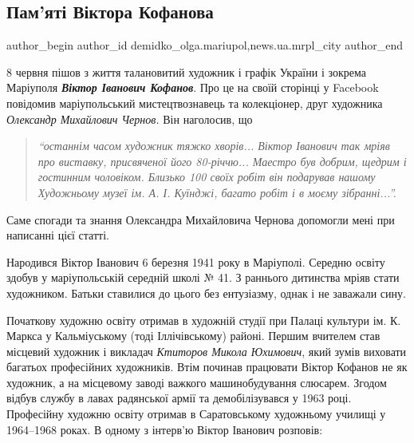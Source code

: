  
 
 
 
 
 
\subsection{Пам'яті Віктора Кофанова}
\label{sec:10_06_2021.stz.news.ua.mrpl_city.1.viktor_kofanov}
 
\ifcmt
 author_begin
   author_id demidko_olga.mariupol,news.ua.mrpl_city
 author_end
\fi


8 червня пішов з життя талановитий художник і графік України і зокрема
Маріуполя \emph{\textbf{Віктор Іванович Кофанов}}. Про це на своїй сторінці у Facebook
повідомив маріупольський мистецтвознавець та колекціонер, друг художника
\emph{Олександр Михайлович Чернов.} Він наголосив, що 
\begin{quote}
\em\enquote{останнім часом художник тяжко
хворів... Віктор Іванович так мріяв про виставку, присвяченої його 80-річчю...
Маестро був добрим, щедрим і гостинним чоловіком. Близько 100 своїх робіт він
подарував нашому Художньому музеї ім. А. І. Куїнджі, багато робіт і в моєму
зібранні...}. 
\end{quote}
Саме спогади та знання Олександра Михайловича Чернова допомогли
мені при написанні цієї статті.

Народився Віктор Іванович 6 березня 1941 року в Маріуполі. Середню освіту
здобув у маріупольській середній школі № 41. З раннього дитинства мріяв стати
художником. Батьки ставилися до цього без ентузіазму, однак і не заважали сину.

Початкову художню освіту отримав в художній студії при Палаці культури ім. К.
Маркса у Кальміуському (тоді Іллічівському) районі. Першим вчителем став
місцевий художник і викладач \emph{Ктиторов Микола Юхимович}, який зумів виховати
багатьох професійних художників. Втім починав працювати Віктор Кофанов не як
художник, а на місцевому заводі важкого машинобудування слюсарем. Згодом відбув
службу в лавах радянської армії та демобілізувався у 1963 році. Професійну
художню освіту отримав в Саратовському художньому училищі у 1964–1968 роках. В
одному з інтерв'ю Віктор Іванович розповів: 


